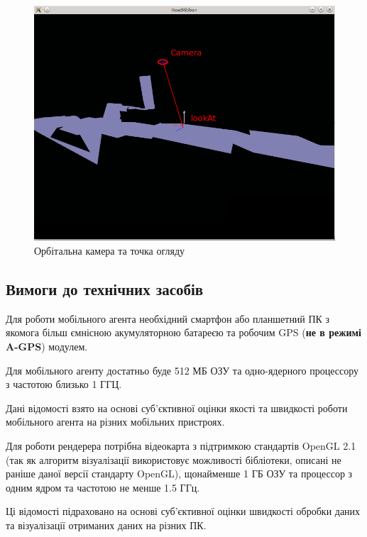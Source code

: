 \documentclass[simple,a4paper,14pt,ukrainian,utf8]{eskdtext}
\begin{document}
		\vspace{3em}
		\begin{figure}
			\centering \includegraphics[scale=0.5]{images/camera2.png}
			\caption{Орбітальна камера та точка огляду}
		\end{figure}
		
	\clearpage \newpage
		
	\subsection{Вимоги до технічних засобів}
	
		Для роботи мобільного агента необхідний смартфон або планшетний ПК з якомога більш ємнісною акумуляторною батареєю та робочим GPS (\textbf{не в режимі A-GPS}) модулем.
		
		Для мобільного агенту достатньо буде 512 МБ ОЗУ та одно-ядерного процессору з частотою близько 1 ГГЦ.
		
		Дані відомості взято на основі суб’єктивної оцінки якості та швидкості роботи мобільного агента на різних мобільних пристроях.
		
		Для роботи рендерера потрібна відеокарта з підтримкою стандартів OpenGL 2.1 (так як алгоритм візуалізації використовує можливості бібліотеки, описані не раніше даної версії стандарту OpenGL), щонайменше 1 ГБ ОЗУ та процессор з одним ядром та частотою не менше 1.5 ГГц.
		
		Ці відомості підраховано на основі суб’єктивної оцінки швидкості обробки даних та візуалізації отриманих даних на різних ПК.
	
\end{document}
